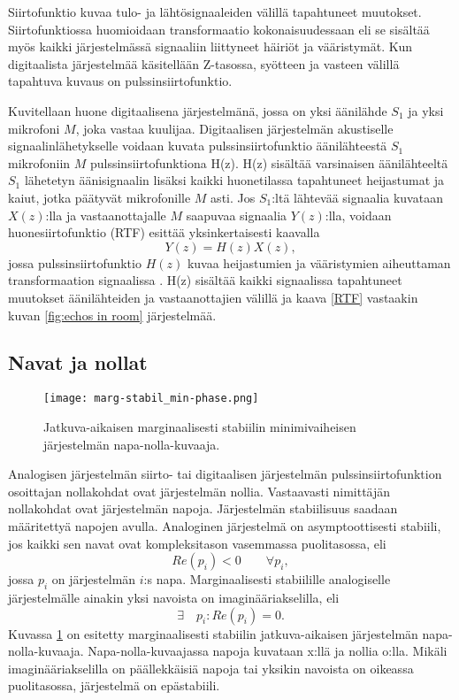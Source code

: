 \documentclass[finnish,12pt]{article}
\begin{document}
Siirtofunktio kuvaa tulo- ja lähtösignaaleiden välillä tapahtuneet muutokset. Siirtofunktiossa huomioidaan transformaatio kokonaisuudessaan eli se sisältää myös kaikki järjestelmässä signaaliin liittyneet häiriöt ja vääristymät. Kun digitaalista järjestelmää käsitellään Z-tasossa, syötteen ja vasteen välillä tapahtuva kuvaus on pulssinsiirtofunktio. 

Kuvitellaan huone digitaalisena järjestelmänä, jossa on yksi äänilähde $S_1$ ja yksi mikrofoni $M$, joka vastaa kuulijaa. Digitaalisen järjestelmän akustiselle signaalinlähetykselle voidaan kuvata pulssinsiirtofunktio äänilähteestä $S_{1}$ mikrofoniin $M$ pulssinsiirtofunktiona H(z). H(z) sisältää varsinaisen äänilähteeltä $S_1$ lähetetyn äänisignaalin lisäksi kaikki huonetilassa tapahtuneet heijastumat ja kaiut, jotka päätyvät mikrofonille $M$ asti. Jos $S_1$:ltä lähtevää signaalia kuvataan $X(z)$:lla ja vastaanottajalle $M$ saapuvaa signaalia $Y(z)$:lla, voidaan huonesiirtofunktio (RTF) esittää yksinkertaisesti kaavalla \begin{equation}
\label{RTF}
Y(z) = H(z)X(z),
\end{equation} jossa pulssinsiirtofunktio $H(z)$ kuvaa heijastumien ja vääristymien aiheuttaman transformaation signaalissa \cite{YHaneda1994}. H(z) sisältää kaikki signaalissa tapahtuneet muutokset äänilähteiden ja vastaanottajien välillä ja kaava \eqref{RTF} vastaakin kuvan \ref{fig:echos in room} järjestelmää.

\subsection{Navat ja nollat}

\begin{figure}[h!]
\centering
\texttt{[image: marg-stabil\_min-phase.png]}
\caption{Jatkuva-aikaisen marginaalisesti stabiilin minimivaiheisen järjestelmän napa-nolla-kuvaaja.}
\label{fig:Laplace marginally stabil minimum phase pzmap}
\end{figure}

Analogisen järjestelmän siirto- tai digitaalisen järjestelmän pulssinsiirtofunktion osoittajan nollakohdat ovat järjestelmän nollia. Vastaavasti nimittäjän nollakohdat ovat järjestelmän napoja. Järjestelmän stabiilisuus saadaan määritettyä napojen avulla. Analoginen järjestelmä on asymptoottisesti stabiili, jos kaikki sen navat ovat kompleksitason vasemmassa puolitasossa, eli \begin{equation}
Re(p_i) < 0 \qquad \forall p_i,
\end{equation} jossa $p_i$ on järjestelmän $i$:s napa. Marginaalisesti stabiilille analogiselle järjestelmälle ainakin yksi navoista on imaginääriakselilla, eli
\begin{equation}
\label{Laplace stabil}
\exists \quad p_i : Re(p_i) = 0.
\end{equation} Kuvassa \ref{fig:Laplace marginally stabil minimum phase pzmap} on esitetty marginaalisesti stabiilin jatkuva-aikaisen järjestelmän napa-nolla-kuvaaja. Napa-nolla-kuvaajassa napoja kuvataan x:llä ja nollia o:lla. Mikäli imaginääriakselilla on päällekkäisiä napoja tai yksikin navoista on oikeassa puolitasossa, järjestelmä on epästabiili.
\end{document}
